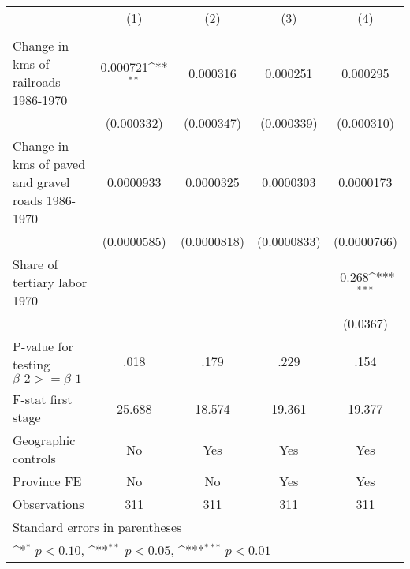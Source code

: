 {
\def\sym#1{\ifmmode^{#1}\else\(^{#1}\)\fi}
\begin{tabular}{l*{4}{c}}
\hline\hline
                &\multicolumn{1}{c}{(1)}&\multicolumn{1}{c}{(2)}&\multicolumn{1}{c}{(3)}&\multicolumn{1}{c}{(4)}\\
                &\multicolumn{1}{c}{}&\multicolumn{1}{c}{}&\multicolumn{1}{c}{}&\multicolumn{1}{c}{}\\
\hline
Change in kms of railroads 1986-1970& 0.000721\sym{**} & 0.000316         & 0.000251         & 0.000295         \\
                &(0.000332)         &(0.000347)         &(0.000339)         &(0.000310)         \\
[1em]
Change in kms of paved and gravel roads 1986-1970&0.0000933         &0.0000325         &0.0000303         &0.0000173         \\
                &(0.0000585)         &(0.0000818)         &(0.0000833)         &(0.0000766)         \\
[1em]
Share of tertiary labor 1970&                  &                  &                  &   -0.268\sym{***}\\
                &                  &                  &                  & (0.0367)         \\
\hline
P-value for testing $\beta\_{2} >= \beta\_{1}$&     .018         &     .179         &     .229         &     .154         \\
F-stat first stage&   25.688         &   18.574         &   19.361         &   19.377         \\
Geographic controls&       No         &      Yes         &      Yes         &      Yes         \\
Province FE     &       No         &       No         &      Yes         &      Yes         \\
Observations    &      311         &      311         &      311         &      311         \\
\hline\hline
\multicolumn{5}{l}{\footnotesize Standard errors in parentheses}\\
\multicolumn{5}{l}{\footnotesize \sym{*} \(p<0.10\), \sym{**} \(p<0.05\), \sym{***} \(p<0.01\)}\\
\end{tabular}
}
